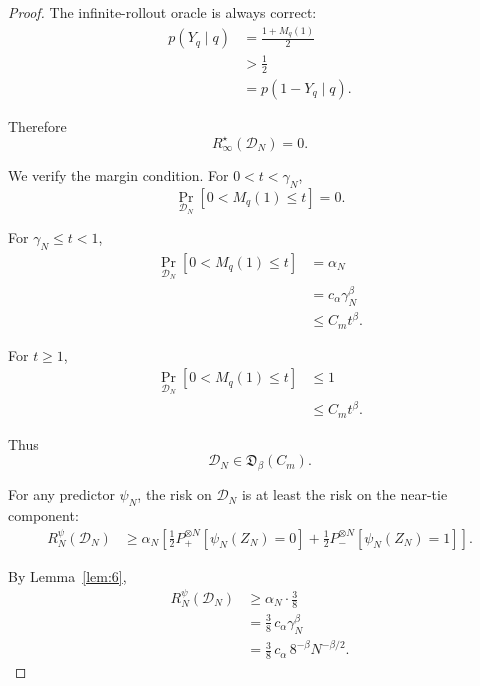 \documentclass{article} %
\providecommand{\D}{\mathcal{D}}
\providecommand{\Risk}{R}
\begin{document}
\begin{proof}
The infinite-rollout oracle is always correct:
\begin{align}
p(Y_q\mid q)
&=
\frac{1+M_q(1)}{2}
\label{eq:thm3-proof-oracle-a}
\\
&>
\frac12
\label{eq:thm3-proof-oracle-b}
\\
&=
p(1-Y_q\mid q).
\label{eq:thm3-proof-oracle-c}
\end{align}

Therefore
\begin{equation}
\label{eq:thm3-proof-riskinf}
\Risk_\infty^\star(\D_N)=0.
\end{equation}

We verify the margin condition.  For \(0<t<\gamma_N\),
\begin{equation}
\label{eq:thm3-proof-margin-cond-a}
\Pr_{\D_N}\!\left[0<M_q(1)\le t\right]=0.
\end{equation}

For \(\gamma_N\le t<1\),
\begin{align}
\Pr_{\D_N}\!\left[0<M_q(1)\le t\right]
&=
\alpha_N
\label{eq:thm3-proof-margin-cond-b}
\\
&=
c_\alpha \gamma_N^\beta
\label{eq:thm3-proof-margin-cond-c}
\\
&\le
C_m t^\beta .
\label{eq:thm3-proof-margin-cond-d}
\end{align}

For \(t\ge 1\),
\begin{align}
\Pr_{\D_N}\!\left[0<M_q(1)\le t\right]
&\le
1
\label{eq:thm3-proof-margin-cond-e}
\\
&\le
C_m t^\beta .
\label{eq:thm3-proof-margin-cond-f}
\end{align}

Thus
\begin{equation}
\label{eq:thm3-proof-D-in-class}
\D_N\in\mathfrak D_\beta(C_m).
\end{equation}

For any predictor \(\psi_N\), the risk on \(\D_N\) is at least the risk on the
near-tie component:
\begin{align}
\Risk_N^\psi(\D_N)
&\ge
\alpha_N
\left[
\frac12 P_+^{\otimes N}\!\left[\psi_N(Z_N)=0\right]
+
\frac12 P_-^{\otimes N}\!\left[\psi_N(Z_N)=1\right]
\right].
\label{eq:thm3-proof-risk-lower-a}
\end{align}

By Lemma~\ref{lem:6},
\begin{align}
\Risk_N^\psi(\D_N)
&\ge
\alpha_N\cdot\frac38
\label{eq:thm3-proof-risk-lower-b}
\\
&=
\frac38\,c_\alpha \gamma_N^\beta
\label{eq:thm3-proof-risk-lower-c}
\\
&=
\frac38\,c_\alpha\,8^{-\beta}N^{-\beta/2}.
\label{eq:thm3-proof-risk-lower-d}
\end{align}


\end{proof}
\end{document}
